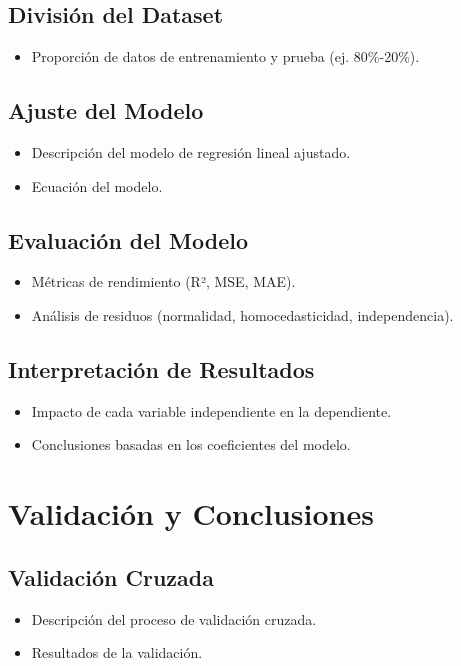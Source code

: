 \documentclass{article}
\begin{document}
\subsection{División del Dataset}
\begin{itemize}
    \item Proporción de datos de entrenamiento y prueba (ej. 80\%-20\%).
\end{itemize}

\subsection{Ajuste del Modelo}
\begin{itemize}
    \item Descripción del modelo de regresión lineal ajustado.
    \item Ecuación del modelo.
\end{itemize}

\subsection{Evaluación del Modelo}
\begin{itemize}
    \item Métricas de rendimiento (R², MSE, MAE).
    \item Análisis de residuos (normalidad, homocedasticidad, independencia).
\end{itemize}

\subsection{Interpretación de Resultados}
\begin{itemize}
    \item Impacto de cada variable independiente en la dependiente.
    \item Conclusiones basadas en los coeficientes del modelo.
\end{itemize}

\section{Validación y Conclusiones}
\subsection{Validación Cruzada}
\begin{itemize}
    \item Descripción del proceso de validación cruzada.
    \item Resultados de la validación.
\end{itemize}
\end{document}
